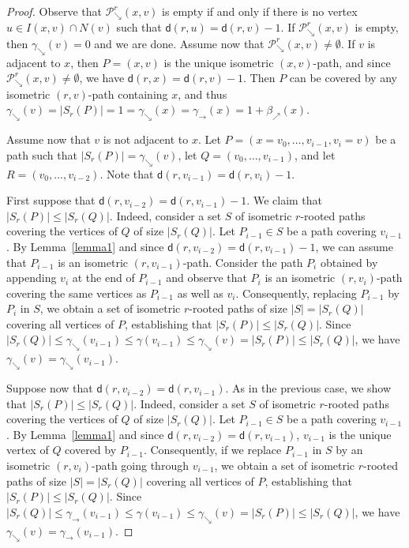 \documentclass[a4paper]{article}
\newcommand{\dist}[2]{\mathsf{d}\left(#1,#2\right)}
\newcommand{\coverP}[2]{S_{#1}\left(#2\right)}
\newcommand{\pathseta}[3]{\mathcal{P}_{\searrow}^{#1}\left(#2,#3\right)}
\begin{document}
\begin{proof}
  Observe that $\pathseta{r}{x}{v}$ is empty if and only if there is
  no vertex $u\in I(x,v) \cap N(v)$ such that
  $\dist{r}{u}=\dist{r}{v}-1$. If $\pathseta{r}{x}{v}$ is empty, then
  $\gamma_{\searrow}(v) =0$ and we are done.  Assume now that
  $\pathseta{r}{x}{v} \neq \emptyset$. If $v$ is adjacent to $x$, then
  $P = (x,v)$ is the unique isometric $(x,v)$-path, and since
  $\pathseta{r}{x}{v} \neq \emptyset$, we have
  $\dist{r}{x} = \dist{r}{v}-1$.  Then $P$ can be covered by any
  isometric $(r,v)$-path containing $x$, and thus
  $\gamma_{\searrow}(v) = |\coverP{r}{P}| = 1 = \gamma_{\searrow}(x) =
  \gamma_{\rightarrow}(x) = 1 + \beta_{\nearrow}(x)$.
  
  Assume now that $v$ is not adjacent to $x$. Let
  $P=(x=v_0,\dots,v_{i-1},v_i=v)$ be a path such that
  $|\coverP{r}{P}| = \gamma_{\searrow}(v)$, let $Q=(v_0,\dots,v_{i-1})$,
  and let $R=(v_0,\dots,v_{i-2})$. Note that
  $\dist{r}{v_{i-1}}=\dist{r}{v_i}-1$.
  
  First suppose that $\dist{r}{v_{i-2}}=\dist{r}{v_{i-1}}-1$.
  We claim that $|\coverP{r}{P}| \leq |\coverP{r}{Q}|$. Indeed,
  consider a set $S$ of isometric $r$-rooted paths covering the
  vertices of $Q$ of size $|\coverP{r}{Q}|$. Let $P_{i-1} \in S$ be a
  path covering $v_{i-1}$. By Lemma~\ref{lemma1} and since
  $\dist{r}{v_{i-2}}=\dist{r}{v_{i-1}}-1$, we can assume that
  $P_{i-1}$ is an isometric $(r,v_{i-1})$-path. Consider the path
  $P_i$ obtained by appending $v_i$ at the end of $P_{i-1}$ and
  observe that $P_i$ is an isometric $(r,v_{i})$-path covering the
  same vertices as $P_{i-1}$ as well as $v_i$. Consequently, replacing
  $P_{i-1}$ by $P_i$ in $S$, we obtain a set of isometric $r$-rooted
  paths of size $|S| = |\coverP{r}{Q}|$ covering all vertices of $P$,
  establishing that $|\coverP{r}{P}| \leq |\coverP{r}{Q}|$. Since
  $|\coverP{r}{Q}| \leq \gamma_{\searrow}(v_{i-1}) \leq
  \gamma(v_{i-1}) \leq \gamma_{\searrow}(v) = |\coverP{r}{P}| \leq
  |\coverP{r}{Q}|$, we have
  $\gamma_{\searrow}(v) = \gamma_{\searrow}(v_{i-1})$.

  Suppose now that $\dist{r}{v_{i-2}}=\dist{r}{v_{i-1}}$. As in the
  previous case, we show that $|\coverP{r}{P}| \leq
  |\coverP{r}{Q}|$. Indeed, consider a set $S$ of isometric $r$-rooted
  paths covering the vertices of $Q$ of size $|\coverP{r}{Q}|$. Let
  $P_{i-1} \in S$ be a path covering $v_{i-1}$. By Lemma~\ref{lemma1}
  and since $\dist{r}{v_{i-2}}=\dist{r}{v_{i-1}}$, $v_{i-1}$ is the
  unique vertex of $Q$ covered by $P_{i-1}$. Consequently, if we
  replace $P_{i-1}$ in $S$ by an isometric $(r,v_i)$-path going
  through $v_{i-1}$, we obtain a set of isometric $r$-rooted paths of
  size $|S| = |\coverP{r}{Q}|$ covering all vertices of $P$,
  establishing that $|\coverP{r}{P}| \leq |\coverP{r}{Q}|$. Since
  $|\coverP{r}{Q}| \leq \gamma_{\rightarrow}(v_{i-1}) \leq
  \gamma(v_{i-1}) \leq \gamma_{\searrow}(v) = |\coverP{r}{P}| \leq
  |\coverP{r}{Q}|$, we have
  $\gamma_{\searrow}(v) = \gamma_{\rightarrow}(v_{i-1})$.


\end{proof}
\end{document}
